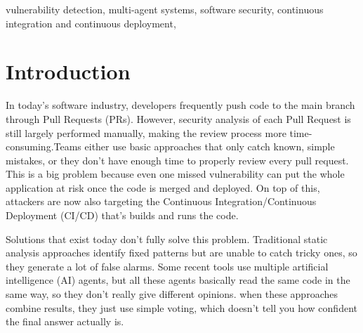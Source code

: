 \documentclass[conference]{IEEEtran}
\begin{document}
\begin{abstract}
Modern software development increasingly relies
on Continuous Integration/Continuous Deployment (CI/CD) pipelines to deliver software rapidly, but automated
security review at the pull request stage remains limited. Existing
security tools rely on rigid static analysis or homogeneous multi-
agent approaches, which may generate false positives or overlook
complex vulnerabilities. This project will present CodeSheriff, an
agentic security auditor that will analyze GitHub pull requests
using structural, semantic, contextual, and SFI-based confidential
execution analysis. A Bayesian inference engine will fuse evidence
from multiple agents to generate confidence-aware vulnerability
assessments, while an automated patch generation and verifica-
tion module will recommend and validate fixes through GitHub
and a web dashboard. The system will enhance CI/CD security
by delivering reliable, explainable, and statistically grounded
vulnerability detection while reducing manual review effort.
\end{abstract}
\vspace{6pt}
\begin{IEEEkeywords}
vulnerability detection, multi-agent systems, software security,
continuous integration and continuous deployment,

\end{IEEEkeywords}


\section{Introduction}
In today’s software industry, developers frequently push code to the main branch through Pull Requests (PRs). However, security analysis of each Pull Request is still largely performed manually, making the review process more time-consuming.Teams either use basic approaches that only catch known, simple mistakes, or they don't have enough time to properly review every pull request. This is a big problem because even one missed vulnerability can put the whole application at risk once the code is merged and deployed. On top of this, attackers are now also targeting the Continuous Integration/Continuous Deployment (CI/CD) that's builds and runs the code.

Solutions that exist today don’t fully solve this problem. Traditional static analysis approaches identify fixed patterns but are unable to catch tricky ones, so they generate a lot of false alarms. Some recent tools use multiple artificial intelligence (AI) agents, but all these agents basically read the same code in the same way, so they don't really give different opinions. when these approaches combine results, they just use simple voting, which doesn't tell you how confident the final answer actually is.
\end{document}
